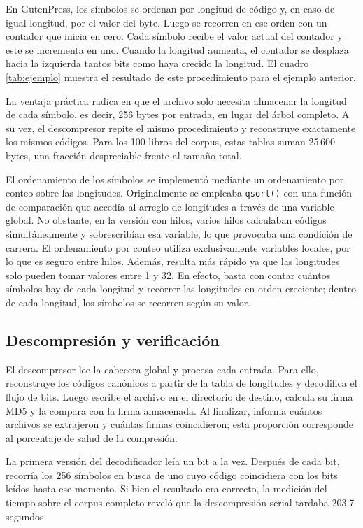 \documentclass{report}
\begin{document}
En GutenPress, los símbolos se ordenan por longitud de código y, en caso de igual longitud, por el valor del byte. Luego se recorren en ese orden con un contador que inicia en cero. Cada símbolo recibe el valor actual del contador y este se incrementa en uno. Cuando la longitud aumenta, el contador se desplaza hacia la izquierda tantos bits como haya crecido la longitud. El cuadro \ref{tab:ejemplo} muestra el resultado de este procedimiento para el ejemplo anterior.

La ventaja práctica radica en que el archivo solo necesita almacenar la longitud de cada símbolo, es decir, 256 bytes por entrada, en lugar del árbol completo. A su vez, el descompresor repite el mismo procedimiento y reconstruye exactamente los mismos códigos. Para los 100 libros del corpus, estas tablas suman 25\,600 bytes, una fracción despreciable frente al tamaño total.

El ordenamiento de los símbolos se implementó mediante un ordenamiento por conteo sobre las longitudes. Originalmente se empleaba \texttt{qsort()} con una función de comparación que accedía al arreglo de longitudes a través de una variable global. No obstante, en la versión con hilos, varios hilos calculaban códigos simultáneamente y sobrescribían esa variable, lo que provocaba una condición de carrera. El ordenamiento por conteo utiliza exclusivamente variables locales, por lo que es seguro entre hilos. Además, resulta más rápido ya que las longitudes solo pueden tomar valores entre 1 y 32. En efecto, basta con contar cuántos símbolos hay de cada longitud y recorrer las longitudes en orden creciente; dentro de cada longitud, los símbolos se recorren según su valor.

\subsection{Descompresión y verificación}

El descompresor lee la cabecera global y procesa cada entrada. Para ello, reconstruye los códigos canónicos a partir de la tabla de longitudes y decodifica el flujo de bits. Luego escribe el archivo en el directorio de destino, calcula su firma MD5 y la compara con la firma almacenada. Al finalizar, informa cuántos archivos se extrajeron y cuántas firmas coincidieron; esta proporción corresponde al porcentaje de salud de la compresión.

La primera versión del decodificador leía un bit a la vez. Después de cada bit, recorría los 256 símbolos en busca de uno cuyo código coincidiera con los bits leídos hasta ese momento. Si bien el resultado era correcto, la medición del tiempo sobre el corpus completo reveló que la descompresión serial tardaba 203.7 segundos.
\end{document}
